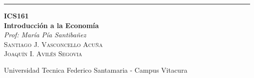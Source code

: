 
\begin{titlepage} %

	\raggedleft %

	\rule{1pt}{\textheight} %
	\hspace{0.05\textwidth} %
	\parbox[b]{0.75\textwidth}{ %

	{\Huge\bfseries ICS161 \\[0.5\baselineskip] Introducción a la Economía}\\[2\baselineskip] %
	{\large\textit{Prof: María Pía Santibañez}}\\[4\baselineskip] %
	{\Large\textsc{Santiago J. Vasconcello Acuña\\Joaquín I. Avilés Segovia}} %

	\vspace{0.5\textheight} %

	{\noindent Universidad Tecnica Federico Santamaria - Campus Vitacura}\\[\baselineskip] %
	}

\end{titlepage}

